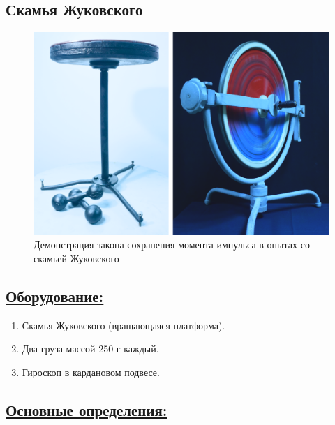 \documentclass[14pt,a4paper,oneside]{extarticle}	%
\begin{document}
	
	\newpage
	\begin{center}
		\subsection*{Скамья Жуковского}
	\end{center}
		
\begin{figure}[H] 	
	\centering 	
	\includegraphics[width=0.9\linewidth]{chair-1.png}
	\caption{Демонстрация закона сохранения момента импульса в опытах со скамьей Жуковского}
	\label{chair-1}
\end{figure}
	
	\subsection*{\underline{Оборудование:}}

			\begin{enumerate} 
			\item Скамья Жуковского (вращающаяся платформа).
			\item Два груза массой 250 г каждый.
			\item Гироскоп в кардановом подвесе.
		\end{enumerate}

\newpage
		\subsection*{\underline{Основные определения:}}
	
\end{document}
